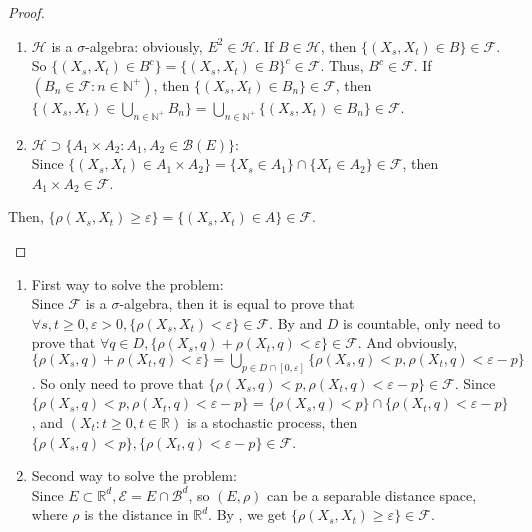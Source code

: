 \documentclass{ctexart}
\begin{document}
\begin{proof}
\begin{enumerate}
      \begin{enumerate}
        \item \(\mathscr{H}\) is a \(\sigma\)-algebra: obviously, \(E^2 \in \mathscr{H}\).
          If \(B \in \mathscr{H}\), then \(\{(X_s,X_t) \in B \} \in \mathscr{F}\).
          So \(\{(X_s,X_t) \in B^c\} = \{(X_s,X_t) \in B\}^c \in \mathscr{F}\).
          Thus, \(B^c \in \mathscr{F}\).
          If \((B_n \in \mathscr{F}: n \in \mathbb{N}^{+})\), then \(\{(X_s,X_t) \in B_n\} \in \mathscr{F}\),
          then \(\{(X_s,X_t) \in \bigcup_{n \in \mathbb{N}^{+}} B_n\} = \bigcup_{n \in \mathbb{N}^{+}} \{(X_s,X_t) \in B_n\} \in \mathscr{F}\).
        \item \(\mathscr{H} \supset \{A_1 \times A_2: A_1, A_2 \in \mathscr{B}(E)\}\):\\
          Since \(\{(X_s,X_t) \in A_1 \times A_2\} = \{X_s \in A_1\} \cap \{X_t \in A_2\} \in \mathscr{F}\),
          then \(A_1 \times A_2 \in \mathscr{F}\).
      \end{enumerate}

      Then, \(\{\rho(X_s,X_t) \geq \varepsilon\} = \{(X_s,X_t) \in A\} \in \mathscr{F}\).

  \end{enumerate}
\end{proof}

\begin{solution}
  \begin{enumerate}
    \item First way to solve the problem:\\
      Since \(\mathscr{F} \) is a \(\sigma\)-algebra, then it is equal to
      prove that \(\forall s,t \geq 0, \varepsilon > 0, \{\rho(X_s,X_t) < \varepsilon\} \in \mathscr{F}\).
      By  and \(D\) is countable, only need to prove that \(\forall q \in D, \{\rho(X_s,q)+ \rho(X_t,q) < \varepsilon\} \in \mathscr{F}\).
      And obviously, \(\{\rho(X_s,q) + \rho(X_t,q) < \varepsilon\} = \bigcup_{p \in D \cap [0, \varepsilon]}\{\rho(X_s,q)< p, \rho(X_t,q)< \varepsilon - p\}\).
      So only need to prove that \(\{\rho(X_s,q) < p , \rho(X_t,q) < \varepsilon - p\} \in \mathscr{F}\).
      Since \(\{\rho(X_s,q) < p , \rho(X_t,q) < \varepsilon - p\}\)
      = \(\{\rho(X_s,q) < p\}\cap \{\rho(X_t,q) < \varepsilon - p\} \),
      and \((X_t: t \geq 0, t \in \mathbb{R})\) is a stochastic process,
      then \(\{\rho(X_s,q) < p\}, \{\rho(X_t,q) < \varepsilon - p\} \in \mathscr{F}\).
    \item Second way to solve the problem:\\
      Since \(E \subset \mathbb{R}^d, \mathscr{E} = E \cap \mathscr{B}^d\), so \((E, \rho)\) can be a separable distance space,
      where \(\rho\) is the distance in \(\mathbb{R}^d\). By , we get \(\{\rho(X_s,X_t) \geq \varepsilon\} \in \mathscr{F} \).
  \end{enumerate}
\end{solution}
\end{document}
